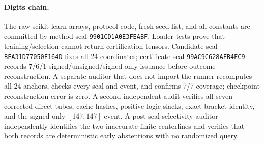 \documentclass{article}
\begin{document}
\paragraph{Digits chain.}
The raw scikit-learn arrays, protocol code, fresh seed list, and all constants
are committed by method seal \texttt{9901CD1A0E3FEABF}.  Loader tests prove
that training/selection cannot return certification tensors.  Candidate seal
\texttt{BFA31D77050F164D} fixes all 24 coordinates; certificate seal
\texttt{99AC9C628AFB4FC9} records 7/6/1 signed/unsigned/signed-only issuance
before outcome reconstruction.  A separate auditor that does not import the
runner recomputes all 24 anchors, checks every seal and event, and confirms
7/7 coverage; checkpoint reconstruction error is zero.  A second independent
audit verifies all seven corrected direct tubes, cache hashes, positive logic
slacks, exact bracket identity, and the signed-only $[147,147]$ event.  A
post-seal selectivity auditor independently identifies the two inaccurate
finite centerlines and verifies that both records are deterministic early
abstentions with no randomized query.
\end{document}
